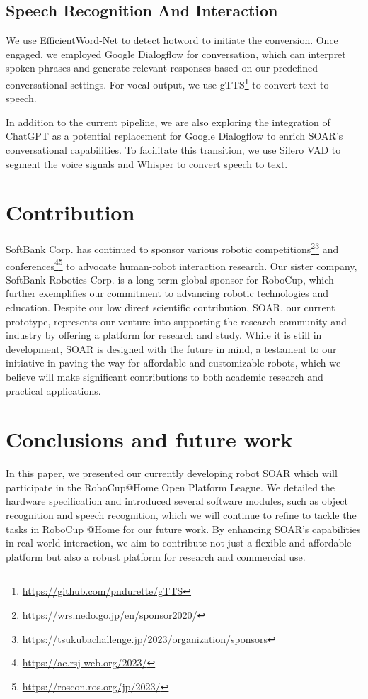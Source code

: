 \documentclass[runningheads,a4paper]{llncs}
\begin{document}
\subsection{Speech Recognition And Interaction}

We use EfficientWord-Net\cite{efficientnet} to detect hotword to initiate the conversion.
Once engaged, we employed Google Dialogflow for conversation, which can interpret spoken phrases and generate relevant responses based on our predefined conversational settings.
For vocal output, we use gTTS\footnote{\url{https://github.com/pndurette/gTTS}} to convert text to speech.

In addition to the current pipeline, we are also exploring the integration of ChatGPT\cite{openai2023gpt4} as a potential replacement for Google Dialogflow to enrich SOAR’s conversational capabilities.
To facilitate this transition, we use Silero VAD\cite{SileroVAD} to segment the voice signals and Whisper\cite{radford2022robust} to convert speech to text.


\section{Contribution}
SoftBank Corp. has continued to sponsor various robotic competitions\footnote{\url{https://wrs.nedo.go.jp/en/sponsor2020/}}\footnote{\url{https://tsukubachallenge.jp/2023/organization/sponsors}} and conferences\footnote{\url{https://ac.rsj-web.org/2023/}}\footnote{\url{https://roscon.ros.org/jp/2023/}} to advocate human-robot interaction research.
Our sister company, SoftBank Robotics Corp. is a long-term global sponsor for RoboCup, which further exemplifies our commitment to advancing robotic technologies and education.
Despite our low direct scientific contribution, SOAR, our current prototype, represents our venture into supporting the research community and industry by offering a platform for research and study.
While it is still in development, SOAR is designed with the future in mind, a testament to our initiative in paving the way for affordable and customizable robots, which we believe will make significant contributions to both academic research and practical applications.

\section{Conclusions and future work}
In this paper, we presented our currently developing robot SOAR which will participate in the RoboCup@Home Open Platform League.
We detailed the hardware specification and introduced several software modules, such as object recognition and speech recognition, which we will continue to refine to tackle the tasks in RoboCup @Home for our future work.
By enhancing SOAR’s capabilities in real-world interaction, we aim to contribute not just a flexible and affordable platform but also a robust platform for research and commercial use.
\end{document}
